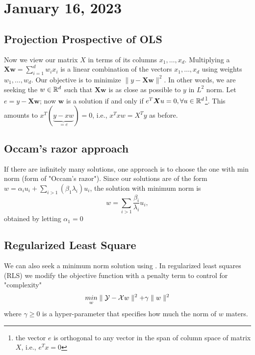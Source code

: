 \newpage
\section{January 16, 2023}
\subsection{Projection Prospective of OLS}
Now we view our matrix $X$ in terms of its columns $x_1, \dots, x_d$. 
Multiplying a $\boldsymbol{Xw} = \sum_{i=1}^d w_ix_i$ is a linear combination of the 
vectors $x_1, \dots, x_d$ using weights $w_1, \dots, w_d$.
Our objective is to minimize $\parallel y- \boldsymbol{Xw} \parallel^2$. In other words, we are seeking the $w \in \mathbb R^d$ such that  $\boldsymbol{Xw}$ is as close as possible to $y$ in $L^2$ norm.
Let $e = y - \boldsymbol{Xw}$; now $\boldsymbol{w}$ is a solution if and only if $e^T \boldsymbol{X}u = 0, \forall u \in \mathbb R^d$\footnote{the vector $e$ is orthogonal to any vector in the span of column space of matrix $X$, i.e., $e^Tx =0$ }.
This amounts to $x^T(\underbrace{y-xw}_{= e}) = 0$, i.e., $x^Txw = X^Ty$ as before.

\subsection{Occam's razor approach}
If there are infinitely many solutions, one approach is to choose the one with min norm (form of "Occam's razor"). 
Since our solutions are of the form $w = \alpha_i u_i + \sum_{i > 1}(\beta_1 \lambda_i)u_i$, the solution with minimum norm is 
$$
w = \sum_{i > 1} \frac{\beta_i}{\lambda_i}u_i,
$$
obtained by letting $\alpha_1 = 0$

\subsection{Regularized Least Square}
We can also seek a minimum norm solution using .
In regularized least squares (RLS) we modify the objective function with a penalty term to control for "complexity" 
$$
\underset{w}{min} \parallel \mathcal Y - \mathcal X w \parallel^2 + \gamma \parallel w \parallel^2
$$
where $\gamma \geq 0$ is a hyper-parameter that specifies how much the norm of $w$ maters.


